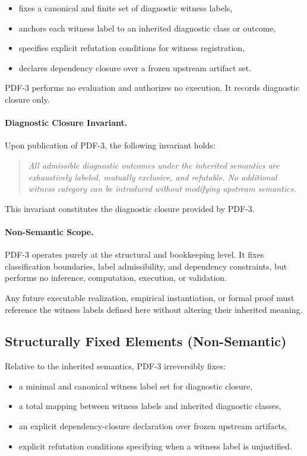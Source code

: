 \begin{itemize}
  \item fixes a canonical and finite set of diagnostic witness labels,
  \item anchors each witness label to an inherited diagnostic class or outcome,
  \item specifies explicit refutation conditions for witness registration,
  \item declares dependency closure over a frozen upstream artifact set.
\end{itemize}

PDF-3 performs no evaluation and authorizes no execution.
It records diagnostic closure only.

\paragraph{Diagnostic Closure Invariant.}
Upon publication of PDF-3, the following invariant holds:

\begin{quote}
\emph{All admissible diagnostic outcomes under the inherited semantics are
exhaustively labeled, mutually exclusive, and refutable.
No additional witness category can be introduced without modifying
upstream semantics.}
\end{quote}

This invariant constitutes the diagnostic closure provided by PDF-3.

\paragraph{Non-Semantic Scope.}
PDF-3 operates purely at the structural and bookkeeping level.
It fixes classification boundaries, label admissibility,
and dependency constraints, but performs no inference,
computation, execution, or validation.

Any future executable realization, empirical instantiation,
or formal proof must reference the witness labels defined here
without altering their inherited meaning.

\subsection{Structurally Fixed Elements (Non-Semantic)}

Relative to the inherited semantics, PDF-3 irreversibly fixes:

\begin{itemize}
  \item a minimal and canonical witness label set for diagnostic closure,
  \item a total mapping between witness labels and inherited diagnostic classes,
  \item an explicit dependency-closure declaration over frozen upstream artifacts,
  \item explicit refutation conditions specifying when a witness label is unjustified.
\end{itemize}
